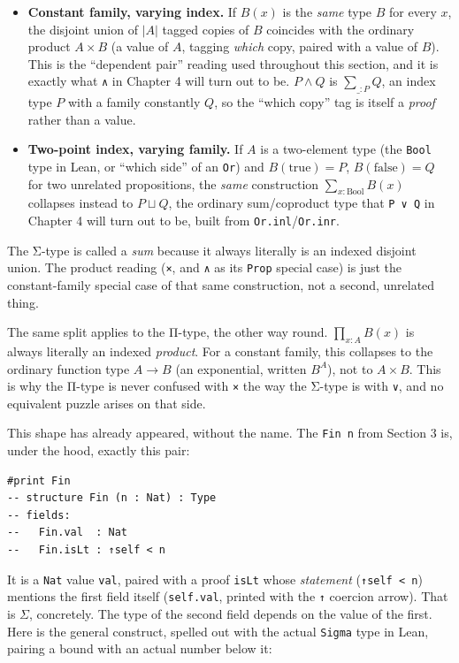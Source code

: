 \begin{itemize}
\tightlist
\item
  \textbf{Constant family, varying index.} If \(B(x)\) is the \emph{same} type \(B\) for every \(x\), the disjoint union of \(|A|\) tagged copies of \(B\) coincides with the ordinary product \(A \times B\) (a value of \(A\), tagging \emph{which} copy, paired with a value of \(B\)). This is the ``dependent pair'' reading used throughout this section, and it is exactly what \texttt{∧} in Chapter 4 will turn out to be. \(P \wedge Q\) is \(\sum_{\_ : P} Q\), an index type \(P\) with a family constantly \(Q\), so the ``which copy'' tag is itself a \emph{proof} rather than a value.
\item
  \textbf{Two-point index, varying family.} If \(A\) is a two-element type (the \texttt{Bool} type in Lean, or ``which side'' of an \texttt{Or}) and \(B(\mathrm{true}) = P\), \(B(\mathrm{false}) = Q\) for two unrelated propositions, the \emph{same} construction \(\sum_{x:\mathrm{Bool}} B(x)\) collapses instead to \(P \sqcup Q\), the ordinary sum/coproduct type that \texttt{P ∨ Q} in Chapter 4 will turn out to be, built from \texttt{Or.inl}/\texttt{Or.inr}.
\end{itemize}

The Σ-type is called a \emph{sum} because it always literally is an indexed disjoint union. The product reading (\texttt{×}, and \texttt{∧} as its \texttt{Prop} special case) is just the constant-family special case of that same construction, not a second, unrelated thing.

The same split applies to the Π-type, the other way round. \(\prod_{x:A} B(x)\) is always literally an indexed \emph{product}. For a constant family, this collapses to the ordinary function type \(A \to B\) (an exponential, written \(B^A\)), not to \(A \times B\). This is why the Π-type is never confused with \texttt{×} the way the Σ-type is with \texttt{∨}, and no equivalent puzzle arises on that side.

This shape has already appeared, without the name. The \texttt{Fin n} from Section 3 is, under the hood, exactly this pair:

\begin{lstlisting}
#print Fin
-- structure Fin (n : Nat) : Type
-- fields:
--   Fin.val  : Nat
--   Fin.isLt : ↑self < n
\end{lstlisting}

It is a \texttt{Nat} value \texttt{val}, paired with a proof \texttt{isLt} whose \emph{statement} (\texttt{↑self < n}) mentions the first field itself (\texttt{self.val}, printed with the \texttt{↑} coercion arrow). That is \(\Sigma\), concretely. The type of the second field depends on the value of the first. Here is the general construct, spelled out with the actual \texttt{Sigma} type in Lean, pairing a bound with an actual number below it:

